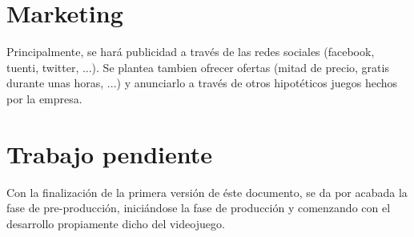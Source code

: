 \documentclass[12 pt, a4paper, twoside]{article}
\begin{document}
\section{Marketing}

Principalmente, se hará publicidad a través de las redes sociales (facebook,
tuenti, twitter, ...). Se plantea tambien ofrecer ofertas (mitad de precio,
gratis durante unas horas, ...) y anunciarlo a través de otros hipotéticos
juegos hechos por la empresa.



\section{Trabajo pendiente}

Con la finalización de la primera versión de éste documento, se da por acabada
la fase de pre-producción, iniciándose la fase de producción y comenzando con
el desarrollo propiamente dicho del videojuego.
\end{document}
